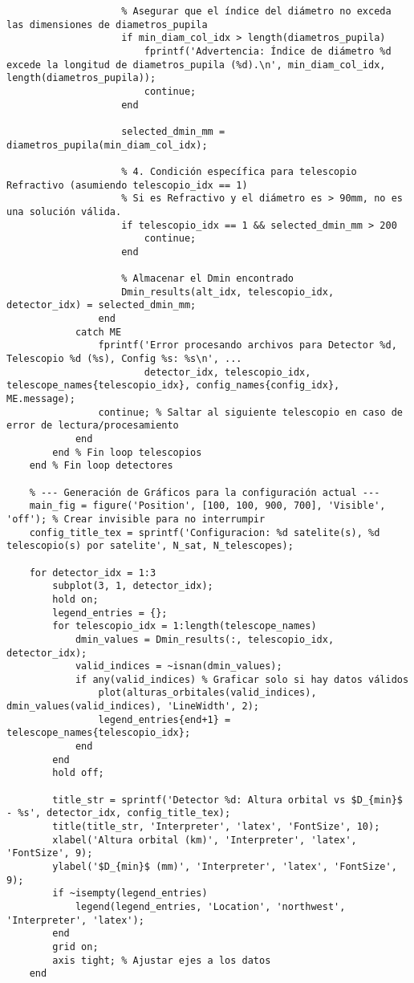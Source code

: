 \begin{verbatim}
                    % Asegurar que el índice del diámetro no exceda las dimensiones de diametros_pupila
                    if min_diam_col_idx > length(diametros_pupila)
                        fprintf('Advertencia: Índice de diámetro %d excede la longitud de diametros_pupila (%d).\n', min_diam_col_idx, length(diametros_pupila));
                        continue;
                    end
                    
                    selected_dmin_mm = diametros_pupila(min_diam_col_idx);

                    % 4. Condición específica para telescopio Refractivo (asumiendo telescopio_idx == 1)
                    % Si es Refractivo y el diámetro es > 90mm, no es una solución válida.
                    if telescopio_idx == 1 && selected_dmin_mm > 200
                        continue; 
                    end

                    % Almacenar el Dmin encontrado
                    Dmin_results(alt_idx, telescopio_idx, detector_idx) = selected_dmin_mm;
                end
            catch ME
                fprintf('Error procesando archivos para Detector %d, Telescopio %d (%s), Config %s: %s\n', ...
                        detector_idx, telescopio_idx, telescope_names{telescopio_idx}, config_names{config_idx}, ME.message);
                continue; % Saltar al siguiente telescopio en caso de error de lectura/procesamiento
            end
        end % Fin loop telescopios
    end % Fin loop detectores

    % --- Generación de Gráficos para la configuración actual ---
    main_fig = figure('Position', [100, 100, 900, 700], 'Visible', 'off'); % Crear invisible para no interrumpir
    config_title_tex = sprintf('Configuracion: %d satelite(s), %d telescopio(s) por satelite', N_sat, N_telescopes);

    for detector_idx = 1:3
        subplot(3, 1, detector_idx);
        hold on;
        legend_entries = {};
        for telescopio_idx = 1:length(telescope_names)
            dmin_values = Dmin_results(:, telescopio_idx, detector_idx);
            valid_indices = ~isnan(dmin_values);
            if any(valid_indices) % Graficar solo si hay datos válidos
                plot(alturas_orbitales(valid_indices), dmin_values(valid_indices), 'LineWidth', 2);
                legend_entries{end+1} = telescope_names{telescopio_idx};
            end
        end
        hold off;

        title_str = sprintf('Detector %d: Altura orbital vs $D_{min}$ - %s', detector_idx, config_title_tex);
        title(title_str, 'Interpreter', 'latex', 'FontSize', 10);
        xlabel('Altura orbital (km)', 'Interpreter', 'latex', 'FontSize', 9);
        ylabel('$D_{min}$ (mm)', 'Interpreter', 'latex', 'FontSize', 9);
        if ~isempty(legend_entries)
            legend(legend_entries, 'Location', 'northwest', 'Interpreter', 'latex');
        end
        grid on;
        axis tight; % Ajustar ejes a los datos
    end
    

\end{verbatim}
